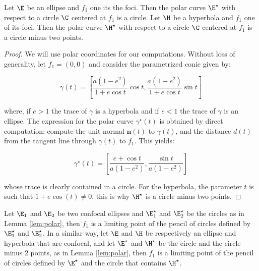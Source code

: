 \begin{lemma}
Let $\E$ be an ellipse and $f_1$ one its the foci. Then the polar curve $\E^{\star}$ with respect to a circle $\C$ centered at $f_1$ is a circle. Let $\H$ be a hyperbola and $f_1$ one of its foci. Then the polar curve $\H^{\star}$ with respect to a circle $\C$ centered at $f_1$ is a circle minus two points.
\label{lem:polar}
\end{lemma}
\begin{proof}

We will use polar coordinates for our computations. Without loss of generality, let $f_{1}=(0,0)$ and consider the parametrized conic given by:

\[ \gamma(t)=\left[\frac{a(1-e^2)}{1+e\cos{t}}\cos{t}, \frac{a(1-e^2)}{1+e\cos{t}}\sin{t}\right] \]

\noindent where, if $e>1$ the trace of $\gamma$ is a hyperbola and if $e<1$ the trace of $\gamma$ is an ellipse. The expression for the polar curve $\gamma^{\star}(t)$ is obtained by direct computation: compute the unit normal $\mathbf{n}(t)$ to $\gamma(t)$, and  the distance $d(t)$ from the tangent line through $\gamma(t)$ to $f_{1}$. This yields:
 
\[ \gamma^{\star}(t)=\left[\frac{e+\cos{t}}{a(1-e^2)},\frac{\sin{t}}{a(1-e^2)}\right] \]

\noindent whose trace is clearly contained in a circle. For the hyperbola, the parameter $t$ is such that $1+e\cos(t) \neq 0 $, this is why $\H^{\star}$ is a circle minus two points.
  
\end{proof}     


\begin{lemma}
\label{lem:limit-focus}
Let $\E_{1}$ and $\E_{2}$ be two confocal ellipses and $\E_{1}^{\star}$ and $\E_{2}^{\star}$ be the circles as in Lemma \ref{lem:polar}, then $f_{1}$ is a limiting point of the pencil of circles defined by $\E_{1}^{\star}$ and $\E_{2}^{\star}$. In a similar way, let $\E$ and $\H$ be respectively an ellipse and hyperbola that are confocal, and let $\E^{\star}$ and $\H^{\star}$ be the circle and the circle minus 2 points, as in Lemma \ref{lem:polar}, then $f_{1}$ is a limiting point of the pencil of circles defined by $\E^{\star}$ and the circle that contains $\H^{\star}$.
\end{lemma}

